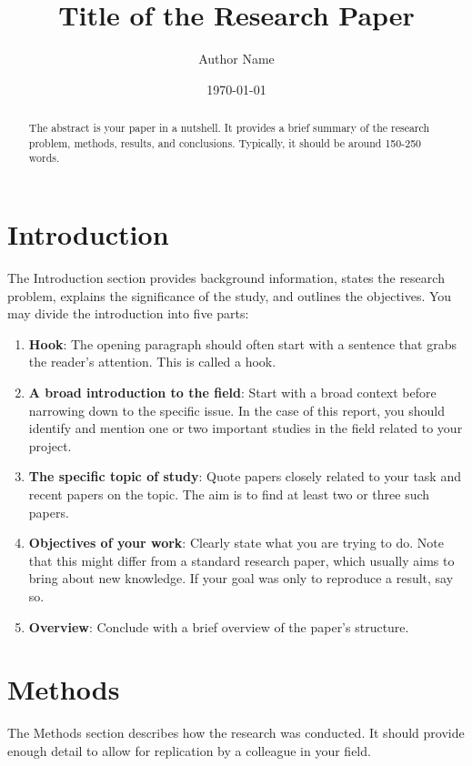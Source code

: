 \documentclass[a4paper,12pt]{article}
\title{Title of the Research Paper}
\author{Author Name}
\date{\today}
\begin{document}
\maketitle

\begin{abstract}
The abstract is your paper in a nutshell. It provides a brief summary of the research problem, methods, results, and conclusions. Typically, it should be around 150-250 words.
\end{abstract}

\section{Introduction}
The Introduction section provides background information, states the research problem, explains the significance of the study, and outlines the objectives. You may divide the introduction into five parts:
\begin{enumerate}
    \item \textbf{Hook}: The opening paragraph should often start with a sentence that grabs the reader's attention. This is called a hook.
    \item \textbf{A broad introduction to the field}: Start with a broad context before narrowing down to the specific issue. In the case of this report, you should identify and mention one or two important studies in the field related to your project.
    \item \textbf{The specific topic of study}: Quote papers closely related to your task and recent papers on the topic. The aim is to find at least two or three such papers.
    \item \textbf{Objectives of your work}: Clearly state what you are trying to do. Note that this might differ from a standard research paper, which usually aims to bring about new knowledge. If your goal was only to reproduce a result, say so.
    \item \textbf{Overview}: Conclude with a brief overview of the paper's structure.
\end{enumerate}

\section{Methods}
The Methods section describes how the research was conducted. It should provide enough detail to allow for replication by a colleague in your field. 
\end{document}
